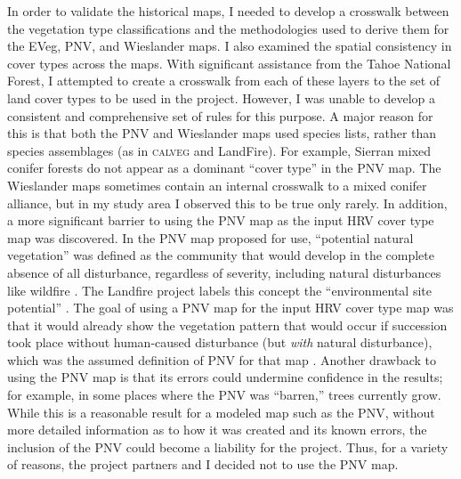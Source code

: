 In order to validate the historical maps, I needed to develop a crosswalk between the vegetation type classifications and the methodologies used to derive them for the EVeg, PNV, and Wieslander maps. I also examined the spatial consistency in cover types across the maps. With significant assistance from the Tahoe National Forest, I attempted to create a crosswalk from each of these layers to the set of land cover types to be used in the project. However, I was unable to develop a consistent and comprehensive set of rules for this purpose. A major reason for this is that both the PNV and Wieslander maps used species lists, rather than species assemblages (as in \textsc{calveg} and LandFire). For example, Sierran mixed conifer forests do not appear as a dominant ``cover type'' in the PNV map. The Wieslander maps sometimes contain an internal crosswalk to a mixed conifer alliance, but in my study area I observed this to be true only rarely. 
In addition, a more significant barrier to using the PNV map as the input HRV cover type map was discovered. In the PNV map proposed for use, ``potential natural vegetation'' was defined as the community that would develop in the complete absence of all disturbance, regardless of severity, including natural disturbances like wildfire \citep{Fites1993}. The Landfire project labels this concept the ``environmental site potential'' \citep{Landfire2007}. The goal of using a PNV map for the input HRV cover type map was that it would already show the vegetation pattern that would occur if succession took place without human-caused disturbance (but \emph{with} natural disturbance), which was the assumed definition of PNV for that map \citep{Potter1998}. Another drawback to using the PNV map is that its errors could undermine confidence in the results; for example, in some places where the PNV was ``barren,'' trees currently grow. While this is a reasonable result for a modeled map such as the PNV, without more detailed information as to how it was created and its known errors, the inclusion of the PNV could become a liability for the project. Thus, for a variety of reasons, the project partners and I decided not to use the PNV map.

